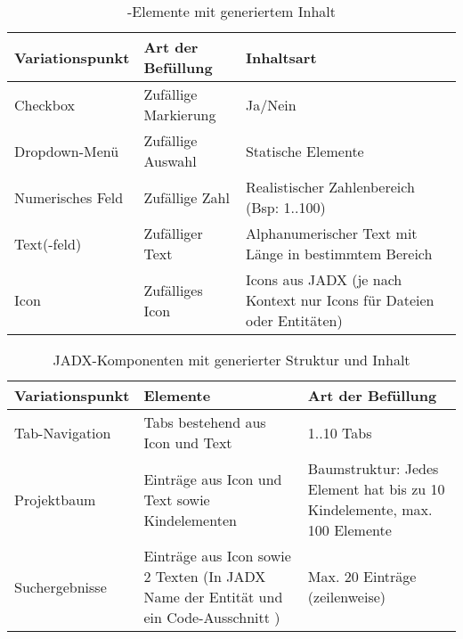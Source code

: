 


\begin{table}[p]
    \centering
    \caption{-Elemente mit generiertem Inhalt}
    \label{tab:variation_fields}
    \smallskip

\begin{tabularx}{\textwidth}{ XXX }
    \toprule
    Variationspunkt & Art der Befüllung & Inhaltsart \\
    \hline
    Checkbox & Zufällige Markierung & Ja/Nein \\
    Dropdown-Menü & Zufällige Auswahl & Statische Elemente \\
    Numerisches Feld & Zufällige Zahl & Realistischer Zahlenbereich (Bsp: 1..100) \\
    Text(-feld) & Zufälliger Text & Alphanumerischer Text mit Länge in bestimmtem Bereich \\
    Icon & Zufälliges Icon & Icons aus JADX (je nach Kontext nur Icons für Dateien oder Entitäten) \\
    \bottomrule
\end{tabularx}


\end{table}

\begin{table}[p]
    \centering
    \caption{JADX-Komponenten mit generierter Struktur und Inhalt}
    \label{tab:variation_components}
    \smallskip

\begin{tabularx}{\textwidth}{ XXX }
    \toprule
    Variationspunkt & Elemente & Art der Befüllung  \\
    \hline
    Tab-Navigation & Tabs bestehend aus Icon und Text & 1..10 Tabs \\
    Projektbaum & Einträge aus Icon und Text sowie Kindelementen & Baumstruktur: Jedes Element hat bis zu 10 Kindelemente, max. 100 Elemente \\
    Suchergebnisse & Einträge aus Icon sowie 2 Texten (In JADX Name der Entität und ein Code-Ausschnitt ) & Max. 20 Einträge (zeilenweise) \\

    \bottomrule
\end{tabularx}
\end{table}

